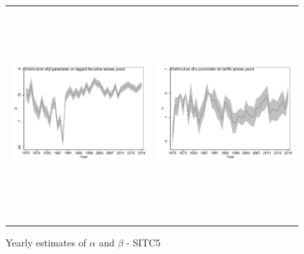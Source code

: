 \documentclass[a4paper,11pt]{article}
\begin{document}
\begin{figure}[htbp]
\caption{Yearly estimates of $\alpha$ and $\beta$ - SITC5}\label{fig: FS_IV_SITC5}
\begin{center}
\begin{tabular}{cc}
\includegraphics[width=3.2in, height=3.2in,keepaspectratio]{beta_lag_SITC5.pdf}
& \includegraphics[width=3.2in,height=3.2in,keepaspectratio]{alpha_tariff_SITC5.pdf} \\
\end{tabular}
\end{center}
\end{figure}

\end{document}
